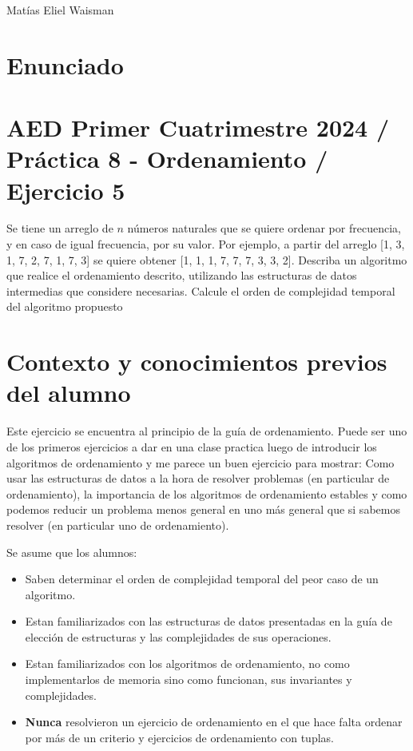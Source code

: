 \documentclass{article}
\begin{document}
\hfill
Matías Eliel Waisman 

\section*{Enunciado}
\section*{\normalsize{AED Primer Cuatrimestre 2024 / Práctica 8 - Ordenamiento / Ejercicio 5}}

Se tiene un arreglo de \(n\) números naturales que se quiere ordenar por frecuencia, y en caso de igual frecuencia,
por su valor. Por ejemplo, a partir del arreglo [1, 3, 1, 7, 2, 7, 1, 7, 3] se quiere obtener [1, 1, 1, 7, 7, 7, 3, 3, 2].
Describa un algoritmo que realice el ordenamiento descrito, utilizando las estructuras de datos intermedias que
considere necesarias. Calcule el orden de complejidad temporal del algoritmo propuesto

\section*{Contexto y conocimientos previos del alumno}
Este ejercicio se encuentra al principio de la guía de ordenamiento. Puede ser uno de los primeros ejercicios a dar en una clase practica luego de introducir los algoritmos de ordenamiento y me parece un buen ejercicio para mostrar: 
Como usar las estructuras de datos a la hora de resolver problemas (en particular de ordenamiento), la importancia de los algoritmos de ordenamiento estables y como podemos reducir un problema menos general en uno más general que si sabemos resolver (en particular uno de ordenamiento). 

Se asume que los alumnos: 
\begin{itemize}
    \item Saben determinar el orden de complejidad temporal del peor caso de un algoritmo.
    \item Estan familiarizados con las estructuras de datos presentadas en la guía de elección de estructuras y las complejidades de sus operaciones.
    \item Estan familiarizados con los algoritmos de ordenamiento, no como implementarlos de memoria sino como funcionan, sus invariantes y complejidades.
    \item \textbf{Nunca} resolvieron un ejercicio de ordenamiento en el que hace falta ordenar por más de un criterio y ejercicios de ordenamiento con tuplas.
\end{itemize}
\end{document}
